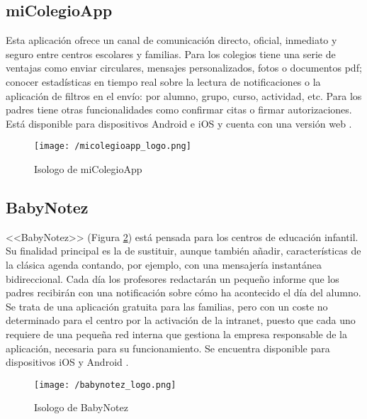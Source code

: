 \subsection{miColegioApp}
Esta aplicación ofrece un canal de comunicación directo, oficial, inmediato y seguro entre centros escolares y familias. Para los colegios tiene una serie de ventajas como enviar circulares, mensajes personalizados, fotos o documentos pdf; conocer estadísticas en tiempo real sobre la lectura de notificaciones o la aplicación de filtros en el envío: por alumno, grupo, curso, actividad, etc. Para los padres tiene otras funcionalidades como confirmar citas o firmar autorizaciones. Está disponible para dispositivos Android e iOS y cuenta con una versión web \cite{creaTactil}.

\begin{figure}[!h]
	\begin{center}
		\texttt{[image: /micolegioapp\_logo.png]}
		\caption{Isologo de miColegioApp}
		\label{fig:micolegioapp}
	\end{center}
\end{figure}

\subsection{BabyNotez}
<<BabyNotez>> (Figura \ref{fig:babynotez}) está pensada para los centros de educación infantil. Su finalidad principal es la de sustituir, aunque también añadir, características de la clásica agenda contando, por ejemplo, con una mensajería instantánea bidireccional. Cada día los profesores redactarán un pequeño informe que los padres recibirán con una notificación sobre cómo ha acontecido el día del alumno. Se trata de una aplicación gratuita para las familias, pero con un coste no determinado para el centro por la activación de la intranet, puesto que cada uno requiere de una pequeña red interna que gestiona la empresa responsable de la aplicación, necesaria para su funcionamiento. Se encuentra disponible para dispositivos iOS y Android \cite{Educo2016}.

\begin{figure}[!h]
	\begin{center}
		\texttt{[image: /babynotez\_logo.png]}
		\caption{Isologo de BabyNotez}
		\label{fig:babynotez}
	\end{center}
\end{figure}

\newpage

